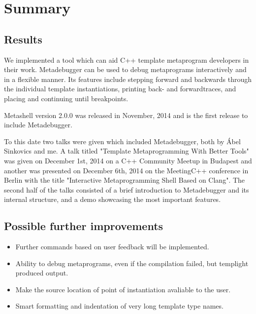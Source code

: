 
\chapter{Summary} \label{summary}

\section{Results}

We implemented a tool which can aid C++ template metaprogram developers in
their work. Metadebugger can be used to debug metaprograms interactively and in
a flexible manner. Its features include stepping forward and backwards through
the individual template instantiations, printing back- and forwardtraces,
and placing and continuing until breakpoints.

Metashell version 2.0.0 was released in November, 2014\cite{github-releases}
and is the first release to include Metadebugger.

To this date two talks were given which included Metadebugger, both by Ábel
Sinkovics and me. A talk titled "Template Metaprogramming With Better Tools"
was given on December 1st, 2014 on a C++ Community Meetup in
Budapest\cite{cpp-meetup} and another was presented on December 6th, 2014 on
the MeetingC++ conference in Berlin with the title "Interactive Metaprogramming
Shell Based on Clang"\cite{meeting-cpp}. The second half of the talks consisted
of a brief introduction to Metadebugger and its internal structure, and a demo
showcasing the most important features.

\section{Possible further improvements}

\begin{itemize}
    \item
        Further commands based on user feedback will be implemented.
    \item
        Ability to debug metaprograms, even if the compilation failed, but
        templight produced output.
    \item
        Make the source location of point of instantiation avaliable to the
        user.
    \item
        Smart formatting and indentation of very long template type names.
\end{itemize}
